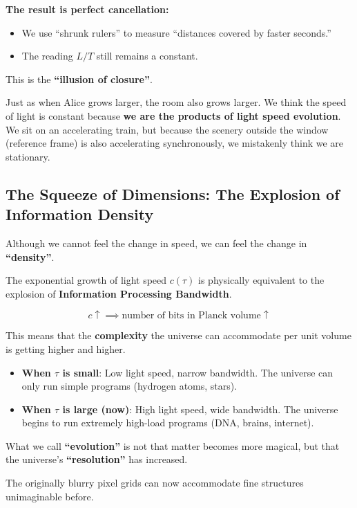 \textbf{The result is perfect cancellation:}

\begin{itemize}
\item We use ``shrunk rulers'' to measure ``distances covered by faster seconds.''

\item The reading $L/T$ still remains a constant.
\end{itemize}

This is the \textbf{``illusion of closure''}.

Just as when Alice grows larger, the room also grows larger. We think the speed of light is constant because \textbf{we are the products of light speed evolution}. We sit on an accelerating train, but because the scenery outside the window (reference frame) is also accelerating synchronously, we mistakenly think we are stationary.

\subsection{The Squeeze of Dimensions: The Explosion of Information Density}

Although we cannot feel the change in speed, we can feel the change in \textbf{``density''}.

The exponential growth of light speed $c(\tau)$ is physically equivalent to the explosion of \textbf{Information Processing Bandwidth}.

\[c \uparrow \implies \text{number of bits in Planck volume} \uparrow\]

This means that the \textbf{complexity} the universe can accommodate per unit volume is getting higher and higher.

\begin{itemize}
\item \textbf{When $\tau$ is small}: Low light speed, narrow bandwidth. The universe can only run simple programs (hydrogen atoms, stars).

\item \textbf{When $\tau$ is large (now)}: High light speed, wide bandwidth. The universe begins to run extremely high-load programs (DNA, brains, internet).
\end{itemize}

What we call \textbf{``evolution''} is not that matter becomes more magical, but that the universe's \textbf{``resolution''} has increased.

The originally blurry pixel grids can now accommodate fine structures unimaginable before.

